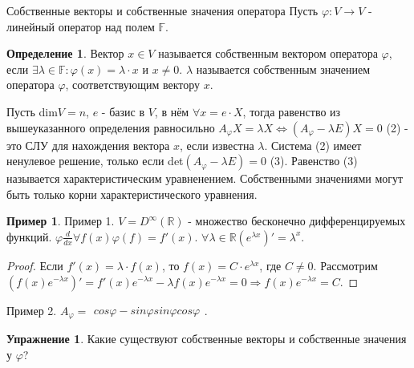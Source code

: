 \documentclass[a4paper, 12pt]{article}
\newcommand{\R}{\mathbb R}
\newcommand{\F}{\mathbb F}
\renewcommand{\phi}{\varphi}
\theoremstyle{definition}
\newtheorem*{definition}{Определение}
\newtheorem*{example1}{Пример}
\newtheorem*{exercise}{Упражнение}
\theoremstyle{plain}
\theoremstyle{remark}
\begin{document}
  \begin{subsection} Собственные векторы и собственные значения оператора
    Пусть $\phi: V \to V$ - линейный оператор над полем $\F$.
    \begin{definition}
      Вектор $x \in V$ называется собственным вектором оператора $\phi$, если $\exists\lambda\in \F: \phi(x) = \lambda \cdot x$ и $x\neq0$. $\lambda$ называется собственным значением оператора $\phi$, соответствующим вектору $x$.
    \end{definition}
    Пусть dim$V = n$, $e$ - базис в $V$, в нём $\forall x = e\cdot X$, тогда равенство из вышеуказанного определения равносильно $A_{\phi}X = \lambda X \Longleftrightarrow (A_{\phi} - \lambda E)X = 0$ (2) - это СЛУ для нахождения вектора $x$, если известна $\lambda$.
    Система (2) имеет ненулевое решение, только если det$(A_{\phi} - \lambda E) = 0$ (3).
    Равенство (3) называется характеристическим уравненением.
    Собственными значениями могут быть только корни характеристического уравнения.
    \begin{example1}
      Пример 1.
      $V = D^{\infty}(\R)$ - множество бесконечно дифференцируемых функций.
      $\phi \frac{d}{dx} \forall f(x) \phi(f) = f'(x)$.
      $\forall\lambda\in\R (e^{\lambda x})' = \lambda^x$.
      \begin{proof}
        Если $f'(x) = \lambda \cdot f(x)$, то $f(x) = C \cdot e^{\lambda x}$, где $C\neq0$.
        Рассмотрим $(f(x)e^{-\lambda x})' = f'(x)e^{-\lambda x} - \lambda f(x)e^{-\lambda x} = 0 \Longrightarrow f(x)e^{-\lambda x} = C$.
      \end{proof}
      Пример 2.
      $A_{\phi} = \begin{matrix}
        cos\phi -sin\phi
        sin\phi  cos\phi
      \end{matrix}$.
      \begin{exercise}
        Какие существуют собственные векторы и собственные значения у $\phi$?
      \end{exercise}
    \end{example1}
  \end{subsection}
\end{document}
